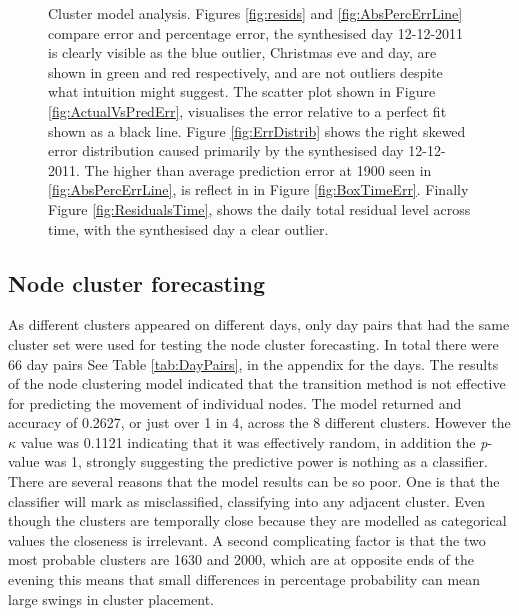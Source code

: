 \begin{figure}[ht]
\caption[Cluster model analysis]{Cluster model analysis. Figures  \ref{fig:resids} and \ref{fig:AbsPercErrLine} compare error and percentage error, the synthesised day 12-12-2011 is clearly visible as the blue outlier, Christmas eve and day, are shown in green and red respectively, and are not outliers despite what intuition might suggest. The scatter plot shown in  Figure \ref{fig:ActualVsPredErr}, visualises the error relative to a perfect fit shown as a black line. Figure \ref{fig:ErrDistrib} shows the right skewed error distribution caused primarily by the synthesised day 12-12-2011. The higher than average prediction error at 1900 seen in \ref{fig:AbsPercErrLine}, is reflect in in  Figure \ref{fig:BoxTimeErr}. Finally  Figure \ref{fig:ResidualsTime}, shows the daily total residual level across time, with the synthesised day a clear outlier.}
\label{fig:modanalysis}
\end{figure}

\FloatBarrier

\subsection{Node cluster forecasting}
\label{sec:NodeClustforce}
As different clusters appeared on different days, only day pairs that had the same cluster set were used for testing the node cluster forecasting. In total there were 66 day pairs See Table \ref{tab:DayPairs}, in the appendix for the days. The results of the node clustering model indicated that the transition method is not effective for predicting the movement of individual nodes. The model returned and accuracy of 0.2627, or just over 1 in 4, across the 8 different clusters. However the $\kappa$ value was 0.1121 indicating that it was effectively random, in addition the \textit{p}-value was 1, strongly suggesting the predictive power is nothing as a classifier. There are several reasons that the model results can be so poor. One is that the classifier will mark as misclassified, classifying into any adjacent cluster. Even though the clusters are temporally close because they are modelled as categorical values the closeness is irrelevant. A second complicating factor is that the two most probable clusters are 1630 and 2000, which are at opposite ends of the evening this means that small differences in percentage probability can mean large swings in cluster placement. 

